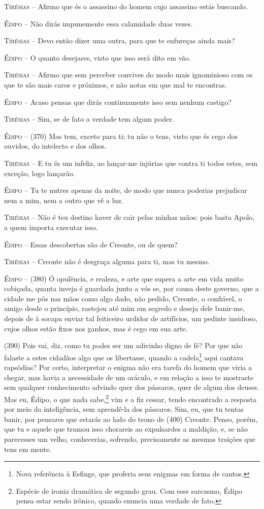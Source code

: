 \textsc{Tirésias} --   Afirmo que és o assassino do homem cujo assassino estás buscando.

\textsc{Édipo} --   Não dirás impunemente essa calamidade duas vezes.

\textsc{Tirésias} --   Devo então dizer uma outra, para que te enfureças ainda mais?

\textsc{Édipo} --   O quanto desejares, visto que isso será dito em vão.

\textsc{Tirésias} --   Afirmo que sem perceber convives do modo mais ignominioso com os que te
são mais caros e próximos, e não notas em que mal te encontras.

\textsc{Édipo} --   Acaso pensas que dirás continuamente isso sem nenhum castigo?

\textsc{Tirésias} --   Sim, se de fato a verdade tem algum poder.

\textsc{Édipo} --   (370) Mas tem, exceto para ti; tu não o tens, visto que és cego dos
ouvidos, do intelecto e dos olhos.

\textsc{Tirésias} --   E tu és um infeliz, ao lançar-me injúrias que contra ti todos estes, sem
exceção, logo lançarão.

\textsc{Édipo} --   Tu te nutres apenas da noite, de modo que nunca poderias prejudicar nem
a mim, nem a outro que vê a luz.

\textsc{Tirésias} --   Não é teu destino haver de cair pelas minhas mãos: pois basta Apolo, a
quem importa executar isso.

\textsc{Édipo} --   Essas descobertas são de Creonte, ou de quem?

\textsc{Tirésias} --   Creonte não é desgraça alguma para ti, mas tu mesmo.

\textsc{Édipo} --   (380) Ó opulência, e realeza, e arte que supera a arte em vida muito
cobiçada, quanta inveja é guardada junto a vós se, por causa deste
governo, que a cidade me pôs nas mãos como algo dado, não pedido,
Creonte, o confiável, o amigo desde o princípio, rastejou até mim em
segredo e deseja dele banir-me, depois de à socapa enviar tal feiticeiro
urdidor de artifícios, um pedinte insidioso, cujos olhos estão fixos nos
ganhos, mas é cego em sua arte.

(390) Pois vai, diz, como tu podes ser um adivinho digno de fé? Por que
não falaste a estes cidadãos algo que os libertasse, quando a
cadela\footnote{Nova referência à Esfinge, que proferia seus enigmas em
  forma de cantos.} aqui cantava rapsódias? Por certo, interpretar o
enigma não era tarefa do homem que viria a chegar, mas havia a
necessidade de um oráculo, e em relação a isso te mostraste sem qualquer
conhecimento advindo quer dos pássaros, quer de algum dos deuses. Mas
eu, Édipo, o que nada sabe,\footnote{Espécie de ironia dramática de
  segundo grau. Com esse sarcasmo, Édipo pensa estar sendo irônico,
  quando enuncia uma verdade de fato.} vim e a fiz cessar,
tendo encontrado a resposta por meio da inteligência, sem aprendê-la dos
pássaros. Sim, eu, que tu tentas banir, por pensares que estarás ao lado
do trono de (400) Creonte. Penso, porém, que tu e aquele que tramou isso
chorareis ao expulsardes a maldição, e, se não parecesses um velho,
conhecerias, sofrendo, precisamente as mesmas traições que tens em
mente.

